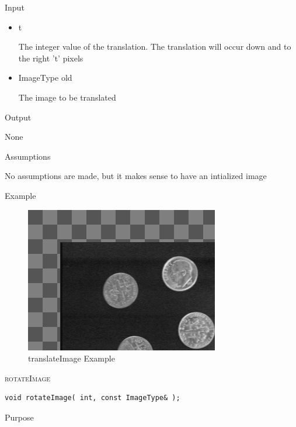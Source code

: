 \documentclass[pdftex, 11pt]{article}
\begin{document}
\begin{description}
\begin{description}
			\item{Input}

				\begin{itemize}

					\item{t}

						The integer value of the translation. The
						translation will occur down and 
						to the right 't' pixels

					\item{ImageType old}

						The image to be translated

				\end{itemize}

			\item{Output}

				None

			\item{Assumptions}

				No assumptions are made, but it makes sense to have
				an intialized image

			\item{Example}

				\begin{figure}[ht!]
					\centering
					\caption{translateImage Example}
				\includegraphics{images/outtrans.png}
			\end{figure}

		\end{description}


	\item{\textsc{rotateImage}}
		\begin{description}

\begin{lstlisting}
void rotateImage( int, const ImageType& );
\end{lstlisting}

			\item{Purpose}


\end{description}
\end{description}
\end{document}
